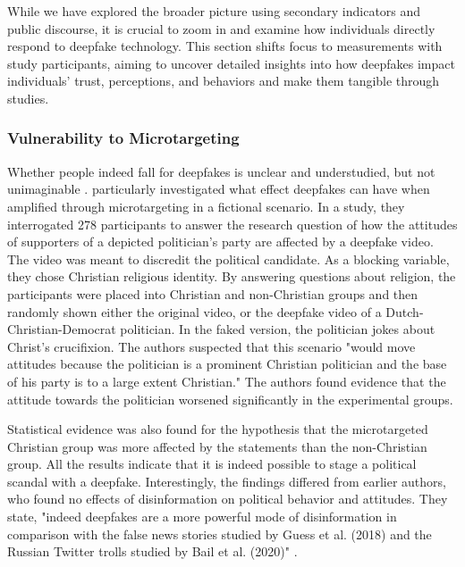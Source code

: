 \documentclass[
  a4paper,  %
  twoside,  %
  bibliography=totoc,
  headsepline,
  cleardoublepage=empty,
  parskip=half,
  draft=false
]{scrbook}
\begin{document}
While we have explored the broader picture using secondary indicators and public discourse, it is crucial to zoom in and examine how individuals directly respond to deepfake technology. This section shifts focus to measurements with study participants, aiming to uncover detailed insights into how deepfakes impact individuals' trust, perceptions, and behaviors and make them tangible through studies.

\subsubsection*{Vulnerability to Microtargeting}
Whether people indeed fall for deepfakes is unclear and understudied, but not unimaginable \cite{dobberMicrotargetedDeepfakesHave2021}. \citet{dobberMicrotargetedDeepfakesHave2021} particularly investigated what effect deepfakes can have when amplified through microtargeting in a fictional scenario. In a study, they interrogated 278 participants to answer the research question of how the attitudes of supporters of a depicted politician's party are affected by a deepfake video. The video was meant to discredit the political candidate. As a blocking variable, they chose Christian religious identity. By answering questions about religion, the participants were placed into Christian and non-Christian groups and then randomly shown either the original video, or the deepfake video of a Dutch-Christian-Democrat politician. In the faked version, the politician jokes about Christ's crucifixion. The authors suspected that this scenario "would move attitudes because the politician is a prominent Christian politician and the base of his party is to a large extent Christian." The authors found evidence that the attitude towards the politician worsened significantly in the experimental groups.

Statistical evidence was also found for the hypothesis that the microtargeted Christian group was more affected by the statements than the non-Christian group. All the results indicate that it is indeed possible to stage a political scandal with a deepfake. Interestingly, the findings differed from earlier authors, who found no effects of disinformation on political behavior and attitudes. They state, "indeed deepfakes are a more powerful mode of disinformation in comparison with the false news stories studied by Guess et al. (2018) and the Russian Twitter trolls studied by Bail et al. (2020)" \cite{dobberMicrotargetedDeepfakesHave2021}.
\end{document}
